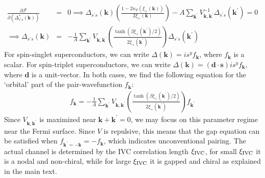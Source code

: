 \documentclass[aps,pra,twocolumn,superscriptaddress,10pt,article,nofootinbib,showpacs,longbibliography]{revtex4-1}
\def \d{{\mathbf d}}
\def \k{{\mathbf k}}
\def \s{{\mathbf s}}
\def \beq{\begin{eqnarray}}
\def \eeq{\end{eqnarray}}
\def \nn{\nonumber \\}
\begin{document}
\beq
\frac{\partial \mathcal{F}}{\partial ( \Delta^*_{s^\prime s}(\k))} &=& 0 \implies  \Delta_{s^\prime s}(\k) \left( \frac{1 - 2 n_F(\xi_+(\k))}{2 \xi_+(\k)} \right) - A \sum_{\k^\prime}V^{-1}_{\k, \k^\prime} \Delta_{s^\prime s}(\k^\prime) = 0 \nn
\implies \Delta_{s^\prime s}(\k) &=& - \frac{1}{A} \sum_{\k^\prime} V_{\k, \k^\prime} \left( \frac{\tanh(\beta \xi_+(\k^\prime)/2) }{2 \xi_+(\k^\prime)} \right) \Delta_{s^\prime s}(\k^\prime)
\eeq
For spin-singlet superconductors, we can write $\Delta(\k) = i s^y f_\k$, where $f_\k$ is a scalar. 
For spin-triplet superconductors, we can write  $\Delta(\k) = (\d \cdot \s) i s^y f_\k$, where $\d$ is a unit-vector.
In both cases, we find the following equation for the `orbital' part of the pair-wavefunction $f_\k$:
\beq
f_\k = -\frac{1}{A} \sum_{\k^\prime} V_{\k, \k^\prime} \left( \frac{\tanh(\beta \xi_+(\k^\prime)/2) }{2 \xi_+(\k^\prime)} \right) f_{\k^\prime}
\label{eq:fkIVCSM}
\eeq
Since $V_{\k, \k^\prime}$ is maximized near $\k + \k^\prime = 0$, we may focus on this parameter regime near the Fermi surface.
Since $V$ is repulsive, this means that the gap equation can be satisfied when $f_{\k^\prime = -\k} = - f_\k$, which indicates unconventional pairing.
The actual channel is determined by the IVC correlation length $\xi_{\rm IVC}$, for small $\xi_{\rm IVC}$ it is a nodal and non-chiral, while for large $\xi_{\rm IVC}$ it is gapped and chiral as explained in the main text.
\end{document}
